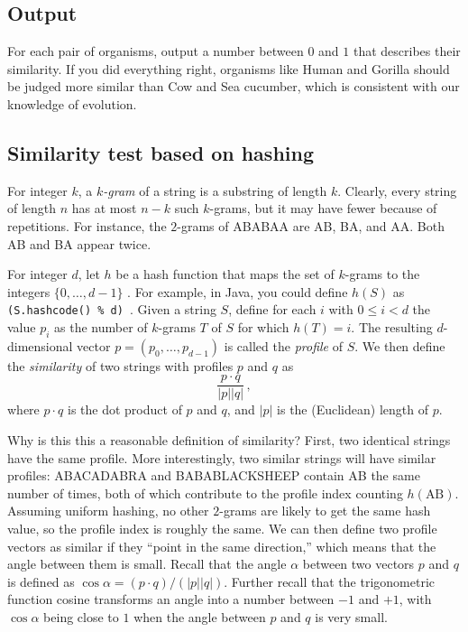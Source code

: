 \documentclass{tufte-handout}
\begin{document}
\subsection{Output}

For each pair of organisms, output a number between $0$ and $1$ that describes their similarity.
If you did everything right, organisms like Human and Gorilla should be judged more similar than Cow and Sea cucumber, which is consistent with our knowledge of evolution.


\subsection{Similarity test based on hashing}

For integer $k$, a \emph{$k$-gram} of a string is a substring of length $k$.
Clearly, every string of length $n$ has at most $n-k$ such $k$-grams, but it may have fewer because of repetitions.
For instance, the $2$-grams of ABABAA are AB, BA, and AA.
Both AB and BA appear twice.

For integer $d$, let $h$ be a hash function that maps the set of $k$-grams to the integers $\{0,\ldots,d-1\}$ .
For example, in Java, you could define $h(S)$ as
{\tt (S.hashcode() \% d) }.
Given a string $S$, define for each $i$ with $0\leq i< d$ the value $p_i$ as the number of $k$-grams $T$ of $S$ for which $h(T) = i$.
The resulting $d$-dimensional vector $p=(p_0,\ldots,p_{d-1})$ is called the \emph{profile} of $S$.
We then define the \emph{similarity} of two strings with profiles $p$ and $q$ as
\[
    \frac{p\cdot q}{\left|p\right| \left|q\right|}\,,
\]
where $p\cdot q$ is the dot product
of $p$ and $q$, and $|p|$ is the (Euclidean) length of $p$.

\medskip
Why is this this a reasonable definition of similarity?
First, two identical strings have the same profile.
More interestingly, two similar strings will have similar profiles: ABACADABRA and BABABLACKSHEEP contain AB the same number of times, both of which contribute to the profile index counting $h(\text{AB})$.
Assuming uniform hashing, no other $2$-grams are likely to get the same hash value, so the profile index is roughly the same.
We can then define two profile vectors as similar if they ``point in the same direction,''
which means that the angle between them is small.
Recall that the angle $\alpha$ between two vectors $p$ and $q$ is defined as \(
  \cos \alpha =
    (p\cdot q)/(\left|p\right| \left|q\right|).
    \)
Further recall that the trigonometric function cosine transforms an angle into a number between $-1$ and $+1$, with $\cos\alpha$ being close to $1$ when the angle between $p$ and $q$ is very small.
\end{document}
